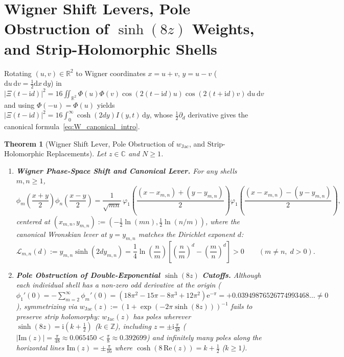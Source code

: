 \documentclass[11pt,reqno]{amsart}
\newtheorem{theorem}{Theorem}[section]
\theoremstyle{definition}
\theoremstyle{remark}
\numberwithin{equation}{section}
\newcommand{\R}{\mathbb{R}}
\newcommand{\C}{\mathbb{C}}
\newcommand{\Z}{\mathbb{Z}}
\newcommand{\dd}{\mathrm{d}}
\newcommand{\ii}{\mathrm{i}}
\newcommand{\ee}{\mathrm{e}}
\newcommand{\Rea}{\mathrm{Re}}
\newcommand{\Ima}{\mathrm{Im}}
\begin{document}
\section{Wigner Shift Levers, Pole Obstruction of \texorpdfstring{$\sinh(8z)$}{sinh(8z)} Weights, and Strip-Holomorphic Shells}\label{sec:shells}

Rotating $(u, v) \in \R^2$ to Wigner coordinates $x = u + v$, $y = u - v$ ($\dd u\,\dd v = \frac{1}{2}\dd x\,\dd y$) in $\lvert\Xi(t - \ii d)\rvert^2 = 16\iint_{\R^2} \Phi(u)\Phi(v)\cos(2(t-\ii d)u)\cos(2(t+\ii d)v)\,\dd u\,\dd v$ and using $\Phi(-u) = \Phi(u)$ yields $\lvert\Xi(t-\ii d)\rvert^2 = 16\int_0^{\infty} \cosh(2dy)I(y,t)\,\dd y$, whose $\frac{1}{2}\partial_d$ derivative gives the canonical formula~\eqref{eq:W_canonical_intro}.

\begin{theorem}[Wigner Shift Lever, Pole Obstruction of $w_{\mathrm{Jac}}$, and Strip-Holomorphic Replacements]\label{thm:strip_shells}
Let $z \in \C$ and $N \ge 1$.
\begin{enumerate}[label=\textup{(\roman*)},leftmargin=2.2em]
\item \textbf{Wigner Phase-Space Shift and Canonical Lever.} For any shells $m, n \ge 1$,
\begin{equation}\label{eq:wigner_shift}
\phi_m\!\left(\frac{x+y}{2}\right)\phi_n\!\left(\frac{x-y}{2}\right) = \frac{1}{\sqrt{mn}}\,\varphi_1\!\left(\frac{(x-x_{m,n})+(y-y_{m,n})}{2}\right)\varphi_1\!\left(\frac{(x-x_{m,n})-(y-y_{m,n})}{2}\right),
\end{equation}
centered at $(x_{m,n}, y_{m,n}) := (-\frac{1}{2}\ln(mn), \frac{1}{2}\ln(n/m))$, where the canonical Wronskian lever at $y = y_{m,n}$ matches the Dirichlet exponent $d$:
\begin{equation}\label{eq:canonical_lever}
\mathcal{L}_{m,n}(d) := y_{m,n}\sinh(2dy_{m,n}) = \frac{1}{4}\ln\!\left(\frac{n}{m}\right)\left[\left(\frac{n}{m}\right)^d - \left(\frac{m}{n}\right)^d\right] > 0 \qquad (m \neq n,\; d > 0).
\end{equation}
\item \textbf{Pole Obstruction of Double-Exponential $\sinh(8z)$ Cutoffs.} Although each individual shell has a non-zero odd derivative at the origin ($\phi_1'(0) = -\sum_{m=2}^{\infty} \phi_m'(0) = (18\pi^2 - 15\pi - 8\pi^3 + 12\pi^2)\ee^{-\pi} = +0.03949876526774993468\dots \neq 0$), symmetrizing via $w_{\mathrm{Jac}}(z) := (1 + \exp(-2\pi\sinh(8z)))^{-1}$ fails to preserve strip holomorphy: $w_{\mathrm{Jac}}(z)$ has poles wherever $\sinh(8z) = \ii(k + \frac{1}{2})$ ($k \in \Z$), including $z = \pm\ii\frac{\pi}{48}$ ($\lvert\Ima(z)\rvert = \frac{\pi}{48} \approx 0.065450 < \frac{\pi}{8} \approx 0.392699$) and infinitely many poles along the horizontal lines $\Ima(z) = \pm\frac{\pi}{16}$ where $\cosh(8\,\Rea(z)) = k + \frac{1}{2}$ ($k \ge 1$).

\end{enumerate}
\end{theorem}
\end{document}
